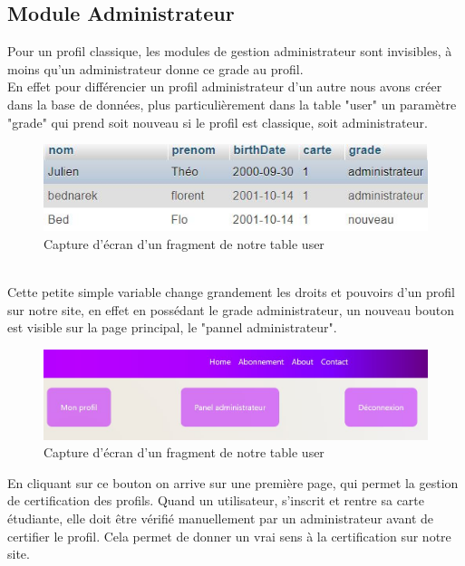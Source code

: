 \documentclass[12pt]{report}
\begin{document}
\subsection{Module Administrateur}
Pour un profil classique, les modules de gestion administrateur sont invisibles, à moins qu'un administrateur donne ce grade au profil.\\
En effet pour différencier un profil administrateur d'un autre nous avons créer dans la base de données, plus particulièrement dans la table "user" un paramètre "grade" qui prend soit nouveau si le profil est classique, soit administrateur.\\
\begin{figure}[h!]
	\begin{center}
		\includegraphics[scale=1.2]{fragBDD.jpg}
	\end{center}
		\caption{Capture d'écran d'un fragment de notre table user}
\end{figure}\\
Cette petite simple variable change grandement les droits et pouvoirs d'un profil sur notre site, en effet en possédant le grade administrateur, un nouveau bouton est visible sur la page principal, le "pannel administrateur".
\begin{figure}[h!]
	\begin{center}
		\includegraphics[scale=0.8]{boutonpanel.jpg}
	\end{center}
		\caption{Capture d'écran d'un fragment de notre table user}
\end{figure}
\clearpage
En cliquant sur ce bouton on arrive sur une première page, qui permet la gestion de certification des profils. Quand un utilisateur, s'inscrit et rentre sa carte étudiante, elle doit être vérifié manuellement par un administrateur avant de certifier le profil. Cela permet de donner un vrai sens à la certification sur notre site.\\
\end{document}

